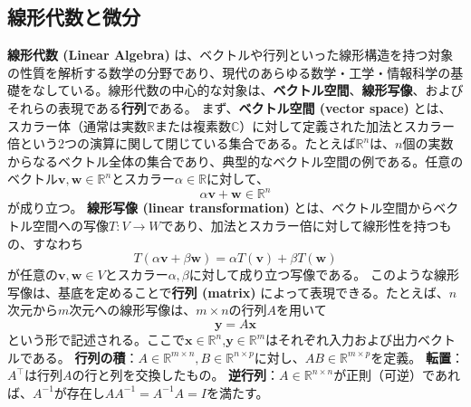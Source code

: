 \subsection{線形代数と微分}
\textbf{線形代数 (Linear Algebra)} は、ベクトルや行列といった線形構造を持つ対象の性質を解析する数学の分野であり、現代のあらゆる数学・工学・情報科学の基礎をなしている。線形代数の中心的な対象は、\textbf{ベクトル空間}、\textbf{線形写像}、およびそれらの表現である\textbf{行列}である。
まず、\textbf{ベクトル空間 (vector space)} とは、スカラー体（通常は実数$\mathbb{R}$または複素数$\mathbb{C}$）に対して定義された加法とスカラー倍という2つの演算に関して閉じている集合である。たとえば$\mathbb{R}^n$は、$n$個の実数からなるベクトル全体の集合であり、典型的なベクトル空間の例である。任意のベクトル$\mathbf{v}, \mathbf{w} \in \mathbb{R}^n$とスカラー$\alpha \in \mathbb{R}$に対して、
\begin{equation}
\alpha\mathbf{v} + \mathbf{w} \in \mathbb{R}^n
\end{equation}
が成り立つ。
\textbf{線形写像 (linear transformation)} とは、ベクトル空間からベクトル空間への写像$T: V \to W$であり、加法とスカラー倍に対して線形性を持つもの、すなわち
\begin{equation}
T(\alpha \mathbf{v} + \beta \mathbf{w}) = \alpha T(\mathbf{v}) + \beta T(\mathbf{w})
\end{equation}
が任意の$\mathbf{v}, \mathbf{w} \in V$とスカラー$\alpha, \beta$に対して成り立つ写像である。
このような線形写像は、基底を定めることで\textbf{行列 (matrix)} によって表現できる。たとえば、$n$次元から$m$次元への線形写像は、$m \times n$の行列$A$を用いて
\begin{equation}
\mathbf{y} = A\mathbf{x}
\end{equation}
という形で記述される。ここで$\mathbf{x} \in \mathbb{R}^n$,$\mathbf{y} \in \mathbb{R}^m$はそれぞれ入力および出力ベクトルである。
\textbf{行列の積}：$A \in \mathbb{R}^{m \times n}, B \in \mathbb{R}^{n \times p}$に対し、$AB \in \mathbb{R}^{m \times p}$を定義。
\textbf{転置}：$A^\top$は行列$A$の行と列を交換したもの。
\textbf{逆行列}：$A \in \mathbb{R}^{n \times n}$が正則（可逆）であれば、$A^{-1}$が存在し$AA^{-1} = A^{-1}A = I$を満たす。
